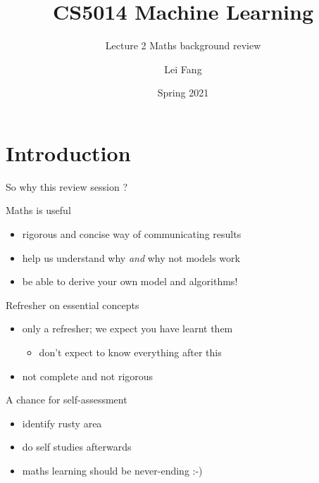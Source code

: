 \documentclass{scrartcl}
\title{CS5014 Machine Learning}
\subtitle{Lecture 2 Maths background review}
\author{Lei Fang}
\date{Spring 2021}
\def\tightlist{}
\begin{document}
\frame{\titlepage}
\maketitle
\hypertarget{introduction}{%
\section{Introduction}\label{introduction}}

\begin{frame}{So why this review session ?}
\protect\hypertarget{so-why-this-review-session}{}

Maths is useful

\begin{itemize}
\tightlist
\item
  rigorous and concise way of communicating results
\item
  help us understand why \emph{and} why not models work
\item
  be able to derive your own model and algorithms!
\end{itemize}

\pause 
\bigskip

Refresher on essential concepts

\begin{itemize}
\tightlist
\item
  only a refresher; we expect you have learnt them

  \begin{itemize}
  \tightlist
  \item
    don't expect to know everything after this
  \end{itemize}
\item
  not complete and not rigorous
\end{itemize}

\pause

\bigskip A chance for self-assessment

\begin{itemize}
\tightlist
\item
  identify rusty area
\item
  do self studies afterwards
\item
  maths learning should be never-ending :-)
\end{itemize}

\end{frame}
\end{document}

